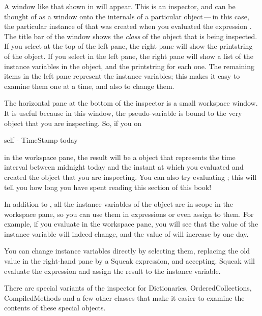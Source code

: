 \documentclass[a4paper,10pt,twoside]{book}
\begin{document}
A window like that shown in  will appear.   
This is an inspector, and can be thought of as a window onto the internals of a particular object\,---\,in this case, the particular instance of \mbox{} 
that was created when you evaluated the expression .
The title bar of the window shows the \emph{class} of the object that is being inspected.
If you select  at the top of the left pane, the right pane will show the printstring of the object.
If you select  in the left pane, the right pane will show a list of the instance variables in the object, and the printstring for each one.  
The remaining items in the left pane represent the instance variables; this makes it easy to examine them one at a time, and also to change them.

The horizontal pane at the bottom of the inspector is a small workspace window.  It is useful because in this window, the pseudo-variable  is bound to the very object that you are inspecting.  
So, if you  on
\begin{code}{}
self - TimeStamp today
\end{code}
in the workspace pane, the result will be a  object that represents the time interval between midnight today and the instant at which you evaluated   and created the  object that you are inspecting.
You can also try evaluating ; this will tell you how long you have spent reading this section of this book!

In addition to , all the instance variables of the object are in scope in the workspace pane, so you can use them in expressions or even assign to them.  For example, if you evaluate  in the workspace pane, you will see that the value of the  instance variable will indeed change, and the value of  will increase by one day.

You can change instance variables directly by selecting them, replacing the old value in the right-hand  pane by a Squeak expression, and accepting.  
Squeak will evaluate the expression and assign the result to the instance variable.

There are special variants of the inspector for Dictionaries, OrderedCollections, CompiledMethods and a few other classes that make it easier to examine the contents of these special objects.
\end{document}
